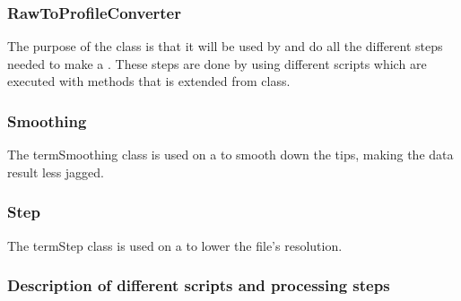 \subsubsection{RawToProfileConverter}
The purpose of the  class is that it will be used by
 and do all the different steps needed to make a . These steps are done by using different scripts which are executed with methods that is extended from
 class. 
\subsubsection{Smoothing}
The term{Smoothing} class is used on a  to smooth down the tips, making the data result less jagged.
\subsubsection{Step}
The term{Step} class is used on a  to lower the file's resolution.
\subsubsection{Description of different scripts and processing steps}

